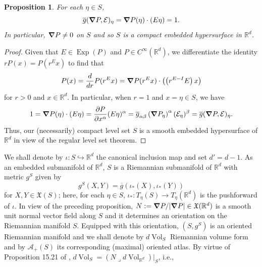 \documentclass[11pt, letter]{book}
\newtheorem{proposition}[theorem]{Proposition}
\newcommand\Exp{\operatorname{Exp}}
\newcommand{\Vol}{\operatorname{Vol}}
\newcommand{\iprod}{\mathbin{\lrcorner}}
\begin{document}
\begin{framed}
\begin{proposition}\label{prop:InnerProdIsOne}
For each $\eta\in S$, 
\begin{equation*}
    \overline{g}(\grad P,\mathcal{E})_{\eta}=\grad P(\eta)\cdot (E\eta)=1.
\end{equation*}
In particular, $\grad P \neq 0$ on $S$ and so $S$ is a compact embedded hypersurface in $\mathbb{R}^d$.
\end{proposition}
\end{framed}
\begin{proof}
Given that $E\in\Exp(P)$ and $P\in C^\infty(\mathbb{R}^d)$, we differentiate the identity $rP(x)=P(r^Ex)$ to find that
\begin{equation*}
    P(x)=\frac{d}{dr}P(r^Ex)=\grad P(r^Ex)\cdot\left(\left(r^{E-I}E\right)x\right)
\end{equation*}
for $r>0$ and $x\in\mathbb{R}^d$. In particular, when $r=1$ and $x=\eta\in S$, we have
\begin{equation*}
    1=\grad P(\eta)\cdot \left(E\eta\right)=\frac{\partial P}{\partial x^\alpha}(E\eta)^\alpha=\overline{g}_{\alpha \beta}\left(\grad P_\eta\right)^{\alpha}(\mathcal{E}_\eta)^\beta=\overline{g}(\grad P,\mathcal{E})_\eta.
\end{equation*}
Thus, our (necessarily) compact level set $S$ is a smooth embedded hypersurface of $\mathbb{R}^d$ in view of the regular level set theorem.
\end{proof}
\noindent We shall denote by $\iota:  S \hookrightarrow \mathbb{R}^d$ the canonical inclusion map and set $d'=d-1$. As an embedded submanifold of $\mathbb{R}^d$, $S$ is a Riemannian submanifold of $\mathbb{R}^d$ with metric $g^S$ given by
\begin{equation*}
    g^S(X,Y)=\overline{g}(\iota_*(X),\iota_*(Y))
\end{equation*}
for $X,Y\in\mathfrak{X}(S)$; here, for each $\eta\in S$,  $\iota_*:T_\eta(S)\to T_\eta(\mathbb{R}^d)$ is the pushforward of $\iota$.  In view of the preceding proposition, $N:=\grad P/|\grad P|\in \mathfrak{X}(\mathbb{R}^d)$ is a smooth unit normal vector field along $S$ and it determines an orientation on the Riemannian manifold $S$. Equipped with this orientation, $(S,g^S)$ is an oriented Riemannian manifold and we shall denote by $d\Vol_S$ Riemannian volume form and by $\mathcal{A}_+(S)$ its corresponding (maximal) oriented atlas. By virtue of Proposition 15.21 of \cite{lee_introduction_2003}, $d\Vol_S=(N\iprod d\Vol_{\mathbb{R}^d})\vert_S$, i.e.,
\end{document}
